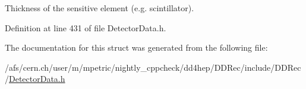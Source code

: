 Thickness of the sensitive element (e.g. scintillator). 

Definition at line 431 of file DetectorData.h.

The documentation for this struct was generated from the following file:\begin{DoxyCompactItemize}
\item 
/afs/cern.ch/user/m/mpetric/nightly\_\-cppcheck/dd4hep/DDRec/include/DDRec/\hyperlink{_detector_data_8h}{DetectorData.h}\end{DoxyCompactItemize}
